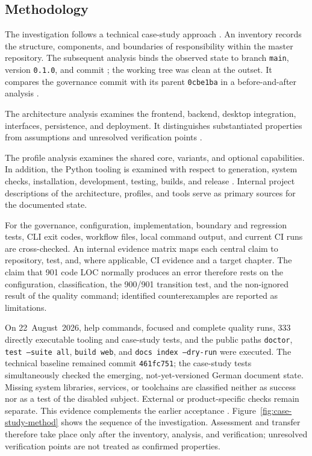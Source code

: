 \subsection{Methodology}
\label{subsec:methodisches-vorgehen}

The investigation follows a technical case-study approach
\parencite{runeson2009case-study}. An inventory records the structure,
components, and boundaries of responsibility within the master repository. The
subsequent analysis binds the observed state to branch \texttt{main}, version
\texttt{0.1.0}, and commit
; the working tree was clean at
the outset. It compares the governance commit with its parent
\texttt{0cbe1ba} in a before-and-after analysis
\parencite{kleiveist2026governance-snapshot,kleiveist2026governance-commit}.

The architecture analysis examines the frontend, backend, desktop
integration, interfaces, persistence, and deployment. It distinguishes
substantiated properties from assumptions and unresolved verification points
\parencite{kleiveist2026architecture}.

The profile analysis examines the shared core, variants, and optional
capabilities. In addition, the Python tooling is examined with respect to
generation, system checks, installation, development, testing, builds, and release
\parencite{kleiveist2026profiles,kleiveist2026tooling}.
Internal project descriptions of the architecture, profiles, and tools serve as
primary sources for the documented state.

For the governance, configuration, implementation, boundary and regression
tests, CLI exit codes, workflow files, local command output, and current CI
runs are cross-checked. An internal evidence matrix maps each central claim to
repository, test, and, where applicable, CI evidence and a target chapter. The
claim that 901 code LOC normally produces an error therefore rests on the
configuration, classification, the 900/901 transition test, and the
non-ignored result of the quality command; identified counterexamples are
reported as limitations.

On 22~August~2026, help commands, focused and complete quality runs, 333
directly executable tooling and case-study tests, and the public paths
\texttt{doctor}, \texttt{test --suite all}, \texttt{build web}, and
\texttt{docs index --dry-run} were executed. The technical baseline remained
commit \texttt{461fc751}; the case-study tests simultaneously checked the
emerging, not-yet-versioned German document state. Missing system libraries,
services, or toolchains are classified neither as success nor as a test of the
disabled subject. External or product-specific checks remain separate. This
evidence complements the earlier acceptance
\parencite{kleiveist2026acceptance}. Figure~\ref{fig:case-study-method} shows the
sequence of the investigation.
Assessment and transfer therefore take place only after the inventory, analysis,
and verification; unresolved verification points are not treated as confirmed
properties.



